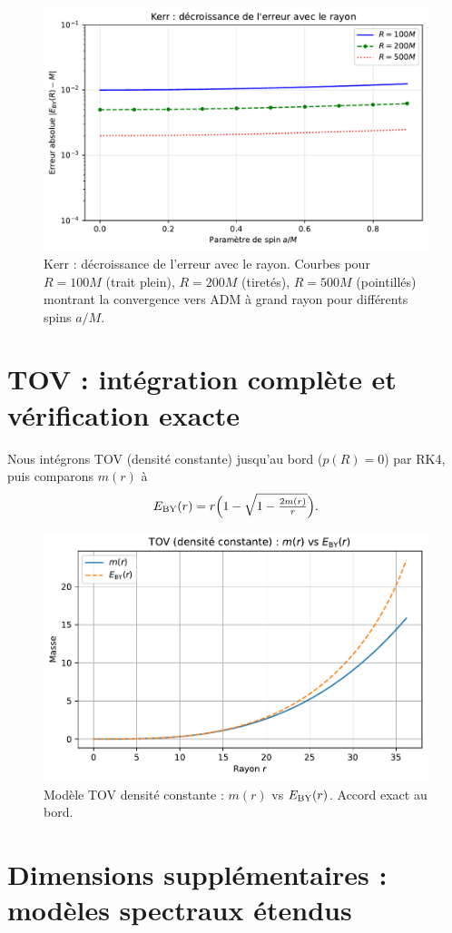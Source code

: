 \documentclass[11pt]{article}
\begin{document}
\begin{figure}[!htb]
\centering
\includegraphics[width=.75\linewidth]{fig_kerr_multiradius.pdf}
\caption{Kerr : d\'ecroissance de l'erreur avec le rayon. Courbes pour $R = 100M$ (trait plein), $R = 200M$ (tiret\'es), $R = 500M$ (pointill\'es) montrant la convergence vers ADM \`a grand rayon pour diff\'erents spins $a/M$.}
\end{figure}
\clearpage

\section{TOV : int\'egration compl\`ete et v\'erification exacte}
Nous int\'egrons TOV (densit\'e constante) jusqu'au bord (\(p(R)=0\)) par RK4, puis comparons $m(r)$ \`a 
\begin{equation}
E_{\rm BY}(r)=r\Big(1-\sqrt{1-\tfrac{2m(r)}{r}}\Big).
\end{equation}
\begin{figure}[!htb]
\centering
\includegraphics[width=.75\linewidth]{fig_tov_full.pdf}
\caption{Mod\`ele TOV densit\'e constante : $m(r)$ vs $E_{\rm BY}(r)$. Accord exact au bord.}
\end{figure}
\clearpage

\section{Dimensions suppl\'ementaires : mod\`eles spectraux \'etendus}
\end{document}
